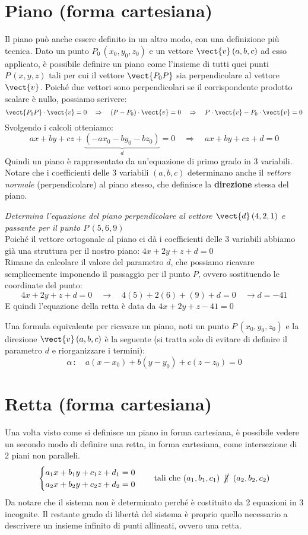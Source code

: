 \section{Piano (forma cartesiana)}
Il piano può anche essere definito in un altro modo, con una definizione più tecnica. Dato un punto \(P_0\,(x_0,y_0,z_0)\) e un vettore \(\vect{v}\,(a,b,c)\) ad esso applicato, è possibile definire un piano come l'insieme di tutti quei punti \(P\,(x,y,z)\) tali per cui il vettore \(\vect{P_0P}\) sia perpendicolare al vettore \(\vect{v}\). Poiché due vettori sono perpendicolari se il corrispondente prodotto scalare è nullo, possiamo scrivere:
\[\vect{P_0P} \cdot \vect{v} =0 \quad \Rightarrow \quad (P-P_0)\cdot \vect{v}=0 \quad \Rightarrow \quad P \cdot \vect{v}-P_0\cdot \vect{v}=0\]
Svolgendo i calcoli otteniamo:
\[ a x+by+cz + \underbrace{(-a x_0-by_0-bz_0)}_{d}=0 \quad \Rightarrow \quad \boxed{ax+by+cz+d=0}\]
Quindi un piano è rappresentato da un'equazione di primo grado in 3 variabili. Notare che i coefficienti delle 3 variabili \((a,b,c)\) determinano anche il \emph{vettore normale} (perpendicolare) al piano stesso, che definisce la \textbf{direzione} stessa del piano. 
\begin{esempio}
 \emph{Determina l'equazione del piano perpendicolare al vettore \(\vect{d} \, (4,2,1)\) e passante per il punto \(P\, (5,6,9)\)}\\[5pt]
Poiché il vettore ortogonale al piano ci dà i coefficienti delle 3 variabili abbiamo già una struttura per il nostro piano: \(4x+2y+z +d=0\)\\[3pt]
Rimane da calcolare il valore del parametro \(d\), che possiamo ricavare semplicemente imponendo il passaggio per il punto \(P\), ovvero sostituendo le coordinate del punto:
\[4x+2y+z+d=0 \quad \longrightarrow \quad 4 (5)+2 (6)+(9)+d=0 \quad \rightarrow d = -41\]
E quindi l'equazione della retta è data da \(4x+2y+z-41=0\)
\end{esempio}
Una formula equivalente per ricavare un piano, noti un punto \(P\,(x_0,y_0,z_0)\) e la direzione \(\vect{v}\,(a,b,c)\) è la seguente (si tratta solo di evitare di definire il parametro \(d\) e riorganizzare i termini):
\[ \alpha \,: \quad \boxed{a(x-x_0)+b(y-y_0)+c(z-z_0)=0}\]

\section{Retta (forma cartesiana)}

Una volta visto come si definisce un piano in forma cartesiana, è possibile vedere un secondo modo di definire una retta, in forma cartesiana, come intersezione di 2 piani non paralleli.
\[\begin{cases}
a_1 x+b_1y+c_1 z+d_1 = 0 \\
a_2 x+b_2y+c_2 z+d_2 = 0
\end{cases} \quad \text{tali che } (a_1,b_1,c_1) \;\; \cancel{\parallel}\;\; (a_2,b_2,c_2)\]
Da notare che il sistema non è determinato perché è costituito da 2 equazioni in 3 incognite. Il restante grado di libertà del sistema è proprio quello necessario a descrivere un insieme infinito di punti allineati, ovvero una retta.

